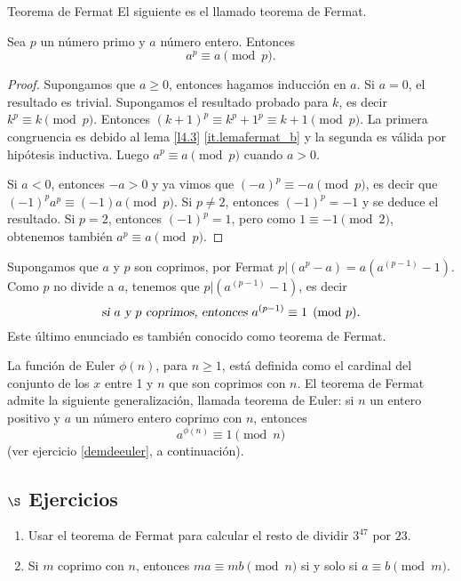 \begin{section}{Teorema de Fermat}
El siguiente es el llamado teorema de Fermat.

\begin{teorema}\label{t4.3} Sea $p$ un número primo y $a$ número
entero. Entonces
$$
a^p\equiv a\pmod{p}.
$$
\end{teorema}
\begin{proof} Supongamos que $a\ge 0$, entonces hagamos
inducción en $a$. Si $a=0$, el resultado es trivial. Supongamos el
resultado probado para $k$, es decir $k^p \equiv k \pmod{p}$.
Entonces $(k+1)^p \equiv k^p +1^p \equiv k+1 \pmod{p}$. La primera
congruencia es debido al lema \ref{l4.3} \ref{it.lemafermat_b} y la segunda es
válida por hipótesis inductiva. Luego $a^p\equiv a\pmod{p}$ cuando $a >0$.

Si $a<0$, entonces $-a>0$ y ya vimos que $(-a)^p \equiv -a
\pmod{p}$, es decir que $(-1)^pa^p \equiv (-1)a \pmod{p}$. Si
$p\not=2$, entonces $(-1)^p=-1$ y se deduce el resultado. Si
$p=2$, entonces $(-1)^p=1$, pero como $1\equiv -1 \pmod{2}$,
obtenemos también $a^p\equiv a\pmod{p}$.
\end{proof}


Supongamos que $a$ y $p$ son coprimos, por Fermat $p|(a^p
-a)=a(a^{(p-1)} -1)$. Como $p$ no divide a $a$, tenemos que
$p|(a^{(p-1)} -1)$, es decir 
$$
\textsl{si $a$ y $p$ coprimos, entonces } a^{(p-1)}\equiv 1\pmod{p}.
$$
Este último enunciado es también conocido como teorema de Fermat.



La función de Euler   $\phi(n)$, para
$n\ge 1$, está definida como el cardinal del conjunto de los $x$
entre 1 y $n$ que son coprimos con $n$. El
teorema de Fermat admite la siguiente generalización, llamada
teorema de Euler:  si $n$ un entero
positivo y $a$ un número entero coprimo con $n$, entonces
$$
a^{\phi(n)} \equiv 1\pmod{n}
$$
(ver ejercicio \ref{demdeeuler}, a continuación).

\subsection*{$\S$ Ejercicios}
\begin{enumerate}
\item Usar el teorema de Fermat para calcular el resto de dividir
$3^{47}$ por $23$.

\item Si $m$ coprimo con $n$, entonces $ma\equiv mb \pmod{n}$ si y solo
si $a\equiv b\pmod{m}$.


\end{enumerate}
\end{section}
